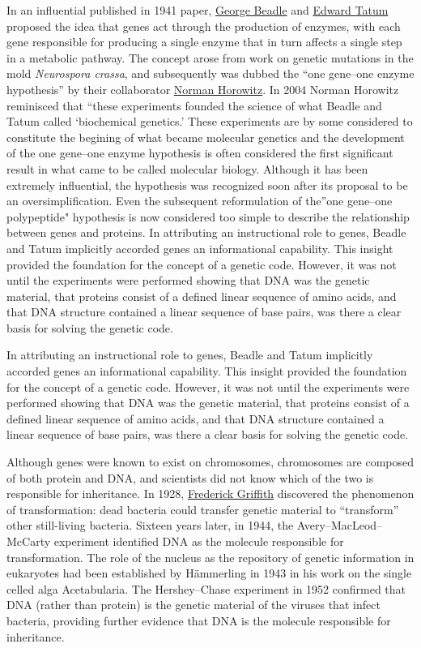 In an influential published in 1941 paper, \href{https://en.wikipedia.org/wiki/George_Beadle}{George Beadle} and \href{https://en.wikipedia.org/wiki/Edward_Tatum}{Edward Tatum} proposed the idea that genes act through the production of enzymes, with each gene responsible for producing a single enzyme that in turn affects a single step in a metabolic pathway. The concept arose from work on genetic mutations in the mold \emph{Neurospora crassa}, and subsequently was dubbed the ``one gene--one enzyme hypothesis'' by their collaborator \href{https://en.wikipedia.org/wiki/Norman_Horowitz}{Norman Horowitz}. In 2004 Norman Horowitz reminisced that ``these experiments founded the science of what Beadle and Tatum called `biochemical genetics.' These experiments are by some considered to constitute the begining of what became molecular genetics and the development of the one gene--one enzyme hypothesis is often considered the first significant result in what came to be called molecular biology. Although it has been extremely influential, the hypothesis was recognized soon after its proposal to be an oversimplification. Even the subsequent reformulation of the''one gene--one polypeptide" hypothesis is now considered too simple to describe the relationship between genes and proteins. In attributing an instructional role to genes, Beadle and Tatum implicitly accorded genes an informational capability. This insight provided the foundation for the concept of a genetic code. However, it was not until the experiments were performed showing that DNA was the genetic material, that proteins consist of a defined linear sequence of amino acids, and that DNA structure contained a linear sequence of base pairs, was there a clear basis for solving the genetic code.

In attributing an instructional role to genes, Beadle and Tatum implicitly accorded genes an informational capability. This insight provided the foundation for the concept of a genetic code. However, it was not until the experiments were performed showing that DNA was the genetic material, that proteins consist of a defined linear sequence of amino acids, and that DNA structure contained a linear sequence of base pairs, was there a clear basis for solving the genetic code.

Although genes were known to exist on chromosomes, chromosomes are composed of both protein and DNA, and scientists did not know which of the two is responsible for inheritance. In 1928, \href{https://en.wikipedia.org/wiki/Frederick_Griffith}{Frederick Griffith} discovered the phenomenon of transformation: dead bacteria could transfer genetic material to ``transform'' other still-living bacteria. Sixteen years later, in 1944, the Avery--MacLeod--McCarty experiment identified DNA as the molecule responsible for transformation. The role of the nucleus as the repository of genetic information in eukaryotes had been established by Hämmerling in 1943 in his work on the single celled alga Acetabularia. The Hershey--Chase experiment in 1952 confirmed that DNA (rather than protein) is the genetic material of the viruses that infect bacteria, providing further evidence that DNA is the molecule responsible for inheritance.

